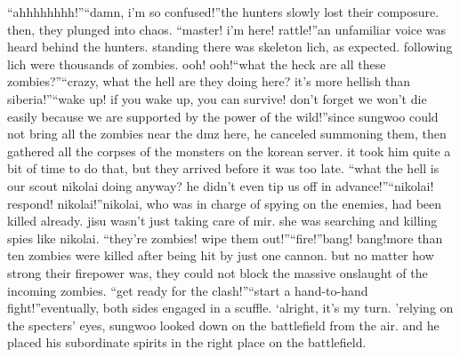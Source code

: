 “ahhhhhhhh!”“damn, i’m so confused!”the hunters slowly lost their composure.
 then, they plunged into chaos.
“master! i’m here! rattle!”an unfamiliar voice was heard behind the hunters.
 standing there was skeleton lich, as expected.
 following lich were thousands of zombies.
ooh! ooh!“what the heck are all these zombies?”“crazy, what the hell are they doing here? it’s more hellish than siberia!”“wake up! if you wake up, you can survive! don’t forget we won’t die easily because we are supported by the power of the wild!”since sungwoo could not bring all the zombies near the dmz here, he canceled summoning them, then gathered all the corpses of the monsters on the korean server.
 it took him quite a bit of time to do that, but they arrived before it was too late.
“what the hell is our scout nikolai doing anyway? he didn’t even tip us off in advance!”“nikolai! respond! nikolai!”nikolai, who was in charge of spying on the enemies, had been killed already.
jisu wasn’t just taking care of mir.
 she was searching and killing spies like nikolai.
“they’re zombies! wipe them out!”“fire!”bang! bang!more than ten zombies were killed after being hit by just one cannon.
 but no matter how strong their firepower was, they could not block the massive onslaught of the incoming zombies.
“get ready for the clash!”“start a hand-to-hand fight!”eventually, both sides engaged in a scuffle.
‘alright, it’s my turn.
’relying on the specters’ eyes, sungwoo looked down on the battlefield from the air.
 and he placed his subordinate spirits in the right place on the battlefield.

